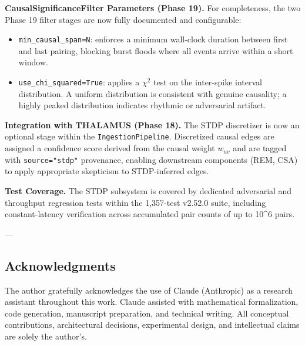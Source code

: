 \textbf{CausalSignif\-icanceFilter Parameters (Phase 19).} For compl\-eteness, the two Phase 19 filter stages are now fully documented and confi\-gurable:
\begin{itemize}
\item \texttt{min\_causal\_span=N}: enforces a minimum wall-clock duration between first and last pairing, blocking burst floods where all events arrive within a short window.
\item \texttt{use\_chi\_squared=True}: applies a $\chi^2$ test on the inter-spike interval distr\-ibution. A uniform distr\-ibution is consistent with genuine causality; a highly peaked distr\-ibution indicates rhythmic or adversarial artifact.

\end{itemize}
\textbf{Integration with THALAMUS (Phase 18).} The STDP discretizer is now an optional stage within the \texttt{IngestionPipeline}. Discretized causal edges are assigned a confidence score derived from the causal weight $w_{uv}$ and are tagged with \texttt{source="stdp"} provenance, enabling downstream components (REM, CSA) to apply appropriate skepticism to STDP-inferred edges.

\textbf{Test Coverage.} The STDP subsystem is covered by dedicated adversarial and throughput regression tests within the 1,357-test v2.52.0 suite, including constant-latency verif\-ication across accumulated pair counts of up to 10^6 pairs.

---
\subsection{Acknow\-ledgments}

The author gratefully ackno\-wledges the use of Claude (Anthropic) as a research assistant throughout this work. Claude assisted with mathe\-matical forma\-lization, code generation, manuscript preparation, and technical writing. All conceptual contr\-ibutions, archi\-tectural decisions, exper\-imental design, and intel\-lectual claims are solely the author's.

